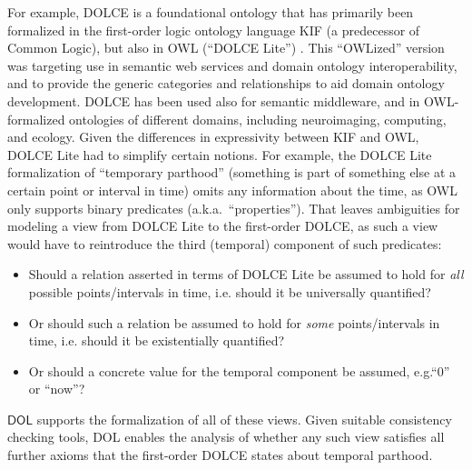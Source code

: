 \documentclass[10pt,fleqn,final]{scrreprt}
\makeatletter
\newcommand*{\eg}{e.g.\@\xspace}
\newcommand*{\ie}{i.e.\@\xspace}
\newcommand*{\DOL}{\ensuremath{\mathsf{DOL}}\xspace}
\newenvironment{definitions}[0]{\medskip }{}
\makeatother
\begin{document}
\begin{definitions}
 
For example,  DOLCE is a foundational ontology that has primarily been formalized in
 the first-order logic 
ontology language KIF (a predecessor of Common Logic), but also in OWL (``DOLCE Lite'') 
\cite{dolce}. This ``OWLized'' version was targeting use in semantic web services and domain 
ontology interoperability, and to provide the generic categories and relationships to aid 
 domain ontology development. DOLCE has been used also for semantic middleware, and in 
OWL-formalized ontologies of different domains, including neuroimaging, computing, and ecology.
  Given the differences in expressivity between KIF and OWL, DOLCE Lite 
   had to simplify certain notions.  For example, 
 the DOLCE Lite formalization of ``temporary parthood'' (something is part of something else at a 
certain point or interval in time) omits any information about the time, as OWL only supports 
binary predicates (a.k.a.\ ``properties'').  That leaves ambiguities for modeling a view from
DOLCE Lite to the first-order DOLCE, as such a view would have to reintroduce the third (temporal) 
component of such predicates:
  \begin{itemize}
  \item Should a relation asserted in terms of DOLCE Lite be assumed to hold for \emph{all} possible points/intervals in time, \ie should it be universally quantified?
  \item Or should such a relation be assumed to hold for \emph{some} points/intervals in time, \ie should it be existentially quantified?
  \item Or should a concrete value for the temporal component be assumed, \eg ``0'' or ``now''?
  \end{itemize}
%  
\DOL supports the formalization of  all of these views. Given suitable consistency 
checking tools, DOL enables the analysis of  whether any such view satisfies all further
 axioms that the  first-order DOLCE states about temporal parthood.


\end{definitions}
\end{document}
